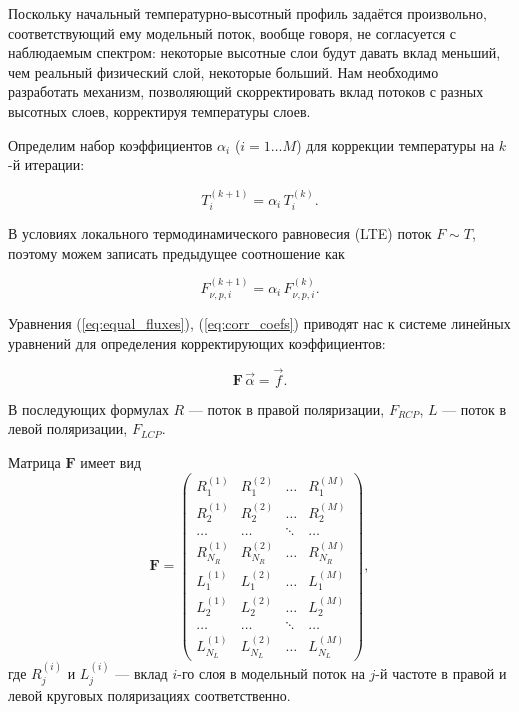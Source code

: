 \documentclass[
 aps, pra,
 amsmath,amssymb,
 11pt,
 final,
tightenlines,
 twoside,
 twocolumn,
 nofloats,
nofootinbib,
 superscriptaddress,
showkeys,
showkeywords,
 ]
{revtex4-2}
\newcommand{\asrem}[1]{{#1}}
\begin{document}
Поскольку начальный температурно-высотный профиль задаётся произвольно, соответствующий ему модельный поток, вообще говоря, не согласуется с наблюдаемым спектром:
 некоторые высотные слои будут давать вклад меньший, чем реальный физический слой, некоторые больший. Нам  необходимо разработать механизм, позволяющий скорректировать вклад потоков с разных высотных слоев, корректируя температуры слоев.

Определим набор коэффициентов $\alpha_i$ ($i=1 \dots M$) для коррекции
температуры на  $k$-й итерации:

\asrem{
\begin{equation}
T_i^{(k+1)} = \alpha_i\, T_i^{(k)}.
\label{eq:TempCorrection}
\end{equation}
}

В условиях локального термодинамического равновесия (LTE) поток $F \sim T$, поэтому можем записать предыдущее соотношение как

\begin{equation}
F_{\nu,p,i}^{(k+1)} = \alpha_i\, F_{\nu,p,i}^{(k)}.
\label{eq:corr_coefs}
\end{equation}

Уравнения (\ref{eq:equal_fluxes}), (\ref{eq:corr_coefs}) приводят нас к системе линейных уравнений для определения корректирующих коэффициентов:

\begin{equation}
\mathbf{F}\,\vec{\alpha} = \vec{f}.
\label{eq:SLEBase}
\end{equation}

\asrem{В последующих формулах $R$ --- поток в правой поляризации, $F_{RCP}$, $L$ --- поток в левой поляризации,  $F_{LCP}$.}

Матрица $\mathbf{F}$ имеет вид
\begin{equation}
\mathbf{F} =
\left(
\begin{matrix}
R^{(1)}_1 & R^{(2)}_1 & \hdots & R^{(M)}_1 \\
R^{(1)}_2 & R^{(2)}_2 & \hdots & R^{(M)}_2 \\
\hdots & \hdots & \ddots & \hdots \\
R^{(1)}_{N_R} & R^{(2)}_{N_R} & \hdots & R^{(M)}_{N_R} \\
L^{(1)}_1 & L^{(2)}_1 & \hdots & L^{(M)}_1 \\
L^{(1)}_2 & L^{(2)}_2 & \hdots & L^{(M)}_2 \\
\hdots & \hdots & \ddots & \hdots \\
L^{(1)}_{N_L} & L^{(2)}_{N_L} & \hdots & L^{(M)}_{N_L}
\end{matrix}
\right),
\end{equation}
где $R^{(i)}_j$ и $L^{(i)}_j$ --- вклад $i$-го слоя в модельный поток на $j$-й частоте в правой и левой круговых поляризациях соответственно.
\end{document}
